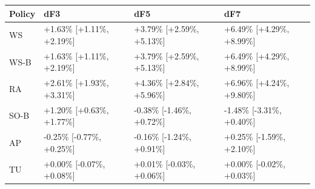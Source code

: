 \begin{tabular}{@{}llll@{}}
\toprule
Policy & dF3 & dF5 & dF7 \\
\midrule
WS & +1.63\% [+1.11\%, +2.19\%] & +3.79\% [+2.59\%, +5.13\%] & +6.49\% [+4.29\%, +8.99\%] \\
WS-B & +1.63\% [+1.11\%, +2.19\%] & +3.79\% [+2.59\%, +5.13\%] & +6.49\% [+4.29\%, +8.99\%] \\
RA & +2.61\% [+1.93\%, +3.31\%] & +4.36\% [+2.84\%, +5.96\%] & +6.96\% [+4.24\%, +9.80\%] \\
SO-B & +1.20\% [+0.63\%, +1.77\%] & -0.38\% [-1.46\%, +0.72\%] & -1.48\% [-3.31\%, +0.40\%] \\
AP & -0.25\% [-0.77\%, +0.25\%] & -0.16\% [-1.24\%, +0.91\%] & +0.25\% [-1.59\%, +2.10\%] \\
TU & +0.00\% [-0.07\%, +0.08\%] & +0.01\% [-0.03\%, +0.06\%] & +0.00\% [-0.02\%, +0.03\%] \\
\bottomrule
\end{tabular}
